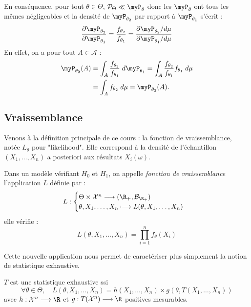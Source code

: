 En conséquence, pour tout $ \theta \in \Theta$, $ \mathcal{P}_\Theta \ll \myP_\theta$ donc 
les $ \myP_\theta$ ont tous les mêmes négligeables et la densité de $ \myP_{ \theta_2}$ par rapport 
à $ \myP_{ \theta_1}$ s'écrit : 
    $$ 
        \frac{ \partial \myP_{ \theta_2}}{ \partial \myP_{ \theta_1}} = \frac{ f_{ \theta_2}}{f_{ \theta_1}} 
        = \frac{ \partial \myP_{ \theta_2} / d \mu}{ \partial \myP_{ \theta_1} / d \mu}
    $$ 
En effet, on a pour tout $A \in \mathcal{A}$ : 
    \begin{align*}
        \myP_{ \theta_2}(A) &= \int_A \frac{f_{ \theta_2}}{f_{ \theta_1}} \; d \myP_{ \theta_1} 
        = \int_A \frac{f_{ \theta_2}}{f_{ \theta_1}} f_{ \theta_1} \; d \mu \\ 
        &= \int_A f_{ \theta_2} \; d \mu = \myP_{\theta_2}(A). 
    \end{align*}

\subsection{Vraissemblance}

Venons à la définition principale de ce cours : la fonction de vraissemblance, notée $ L_\theta$ 
pour "likelihood". Elle correspond à la densité de l'échantillon $(X_1, \dots, X_n)$ a posteriori aux 
résultats $X_i( \omega)$. 

\begin{definition}
    Dans un modèle vérifiant $H_0$ et $H_1$, on appelle \emph{fonction de vraissemblance}
    l'application $L$ définie par : 
        $$ 
            L : 
                \begin{cases}
                    \Theta \times \mathcal{X}^n \longrightarrow (\R_+, \mathcal{B}_{\R_+}) \\ 
                    \theta, X_1, \dots, X_n \longmapsto L( \theta, X_1, \dots, X_n)
                \end{cases}
        $$ 
    elle vérifie : 
        $$
            L(\theta, X_1, \dots, X_n) = \prod_{i=1}^{n} f_\theta(X_i) 
        $$
\end{definition}

Cette nouvelle application nous permet de caractériser plus simplement la notion de statistique 
exhaustive. 

\begin{theorem}
    $T$ est une statistique exhaustive ssi 
        $$ \forall \theta \in \Theta, \quad L( \theta, X_1, \dots, X_n) = h(X_1, \dots, X_n) \times g( \theta, T(X_1, \dots, X_n)) $$
    avec $ h : \mathcal{X}^n \longrightarrow \R$ et $ g : T( \mathcal{X}^n) \longrightarrow \R$ positives mesurables. 
\end{theorem}

